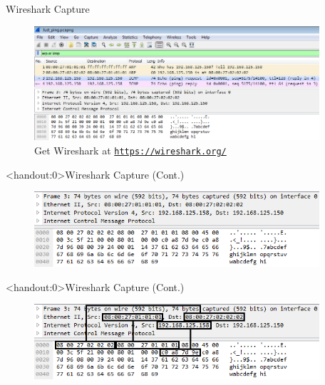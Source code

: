 \begin{frame}{Wireshark Capture}
	\begin{figure}
		\includegraphics[width=300pt]{../common/images/Wireshark__ARP_or_ICMP.png} \newline \newline
		Get Wireshark at \texttt{\href{https://wireshark.org/}{https://wireshark.org/}}
	\end{figure}
\end{frame}

\begin{frame}<handout:0>{Wireshark Capture (Cont.)}
	\begin{figure}
		\includegraphics[width=300pt]{../common/images/Wireshark__ARP_or_ICMP_zoom.png}
	\end{figure}
\end{frame}

\begin{frame}<handout:0>{Wireshark Capture (Cont.)}
	\begin{figure}
		\includegraphics[width=300pt]{../common/images/Wireshark__ARP_or_ICMP_zoom_with_lines.png}
	\end{figure}
\end{frame}
